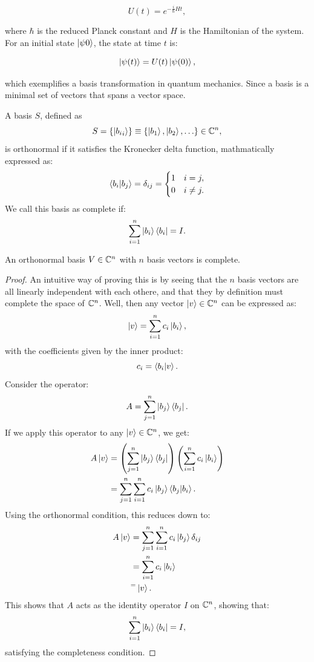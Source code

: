\documentclass[12pt]{article}
\begin{document}
\[
U(t) = e^{- \frac{i}{\hbar} H t}, 
\]

where $\hbar$ is the reduced Planck constant and $H$ is the Hamiltonian of the system. For an initial state $\ket{\psi 0}$, the state at time $t$ is:

\[
\ket{\psi(t)} = U(t)\ket{\psi(0)},
\]

which exemplifies a basis transformation in quantum mechanics. Since a basis is a minimal set of vectors that spans a vector space. 

\begin{definition}
    A basis $S$, defined as
    \[
    S = \{\ket{{b_i}_i}\} \equiv \{\ket{b_1}, \ket{b_2}, \ldots\} \in \mathbb{C}^n,
    \]
    is orthonormal if it satisfies the Kronecker delta function, mathmatically expressed as:
    \[
    \braket{b_i}{b_j} = \delta_{ij} = \begin{cases}
        1 & i = j,  \\
        0 & i \neq j. \\
    \end{cases}
    \]
    We call this basis as complete if:
    \[
    \sum_{i=1}^{n} \ket{b_i} \bra{b_i} = I.
    \]
\end{definition}

\begin{theorem}
    An orthonormal basis $V \in \mathbb{C}^n$ with $n$ basis vectors is complete. 
\end{theorem}

\begin{proof}
    An intuitive way of proving this is by seeing that the $n$ basis vectors are all linearly independent with each othere, and that they by definition must complete the space of $\mathbb{C}^n$. Well, then any vector $\ket{v} \in \mathbb{C}^n$ can be expressed as:
    \[
    \ket{v} = \sum_{i=1}^{n} c_i \ket{b_i},
    \] 
    with the coefficients given by the inner product:
    \[
    c_i = \braket{b_i}{v}.
    \]
    Consider the operator:
    \[
    A = \sum_{j=1}^{n} \ket{b_j} \bra{b_j}.
    \]
    If we apply this operator to any $\ket{v} \in \mathbb{C}^n$, we get:
    \begin{align*}
      A \ket{v} &= \left(\sum_{j=1}^{n} \ket{b_j} \bra{b_j}\right)\left(\sum_{i=1}^{n} c_i \ket{b_i}\right) \\
      &= \sum_{j=1}^{n} \sum_{i=1}^{n} c_i \ket{b_j} \bra{b_j} \ket{b_i}. \\
    \end{align*}
    Using the orthonormal condition, this reduces down to:
    \begin{align*}
      A \ket{v} &= \sum_{j=1}^{n} \sum_{i=1}^{n} c_i \ket{b_j} \delta_{ij} \\
      &= \sum_{i=1}^{n} c_i \ket{b_i} \\
      &^= \ket{v}.\\
    \end{align*}
    This shows that $A$ acts as the identity operator $I$ on $\mathbb{C}^n$, showing that:
    \[
        \sum_{i=1}^{n} \ket{b_i} \bra{b_i} = I,
    \]  
    satisfying the completeness condition. 
\end{proof}
\end{document}
